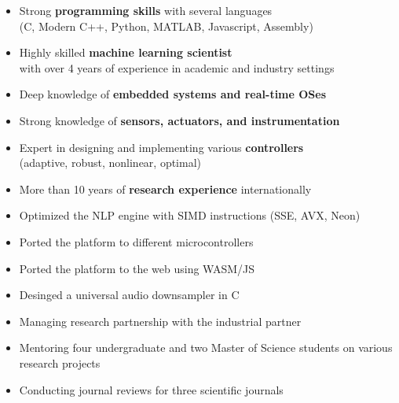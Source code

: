 \documentclass[10pt,letterpaper,ragged2e,compact]{mocv}
\begin{document}
\begin{paracol}{2}
    \begin{itemize}
        \item Strong \textbf{programming skills} with several languages \\
            (C, Modern C++, Python, MATLAB, Javascript, Assembly)
        \item Highly skilled \textbf{machine learning scientist} \\
            with over 4 years of experience in academic and industry settings
        \item Deep knowledge of \textbf{embedded systems and real-time OSes} \\
        \item Strong knowledge of \textbf{sensors, actuators, and instrumentation}
        \item Expert in designing and implementing various \textbf{controllers} \\
            (adaptive, robust, nonlinear, optimal)
        \item More than 10 years of \textbf{research experience} internationally
    \end{itemize}
    \begin{itemize}
        \item Optimized the NLP engine with SIMD instructions (SSE, AVX, Neon)
        \item Ported the platform to different microcontrollers
        \item Ported the platform to the web using WASM/JS
        \item Desinged a universal audio downsampler in C
    \end{itemize}
    \divider
    \begin{itemize}
        \item Managing research partnership with the industrial partner %
        \item Mentoring four undergraduate and two Master of Science students on various research projects
        \item Conducting journal reviews for three scientific journals

\end{itemize}
\end{paracol}
\end{document}
